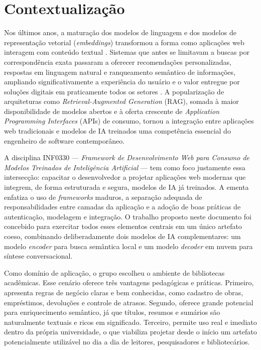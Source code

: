 \documentclass[monografia,abnt]{inf-ufg-modificado}
\begin{document}
\chapter{Contextualização}

Nos últimos anos, a maturação dos modelos de linguagem e dos modelos de representação vetorial (\textit{embeddings}) transformou a forma como aplicações web interagem com conteúdo textual \cite{vaswani,devlin}. Sistemas que antes se limitavam a buscas por correspondência exata passaram a oferecer recomendações personalizadas, respostas em linguagem natural e ranqueamento semântico de informações, ampliando significativamente a experiência do usuário e o valor entregue por soluções digitais em praticamente todos os setores \cite{breeding}. A popularização de arquiteturas como \textit{Retrieval-Augmented Generation} (RAG), somada à maior disponibilidade de modelos abertos e à oferta crescente de \textit{Application Programming Interfaces} (APIs) de consumo, tornou a integração entre aplicações web tradicionais e modelos de IA treinados uma competência essencial do engenheiro de software contemporâneo.

A disciplina INF0330 --- \textit{Framework de Desenvolvimento Web para Consumo de Modelos Treinados de Inteligência Artificial} --- tem como foco justamente essa intersecção: capacitar o desenvolvedor a projetar aplicações web modernas que integrem, de forma estruturada e segura, modelos de IA já treinados. A ementa enfatiza o uso de \textit{frameworks} maduros, a separação adequada de responsabilidades entre camadas da aplicação e a adoção de boas práticas de autenticação, modelagem e integração. O trabalho proposto neste documento foi concebido para exercitar todos esses elementos centrais em um único artefato coeso, combinando deliberadamente dois modelos de IA complementares: um modelo \textit{encoder} para busca semântica local e um modelo \textit{decoder} em nuvem para síntese conversacional.

Como domínio de aplicação, o grupo escolheu o ambiente de bibliotecas acadêmicas. Esse cenário oferece três vantagens pedagógicas e práticas. Primeiro, apresenta regras de negócio claras e bem conhecidas, como cadastro de obras, empréstimos, devoluções e controle de atrasos. Segundo, oferece grande potencial para enriquecimento semântico, já que títulos, resumos e sumários são naturalmente textuais e ricos em significado. Terceiro, permite uso real e imediato dentro da própria universidade, o que viabiliza projetar desde o início um artefato potencialmente utilizável no dia a dia de leitores, pesquisadores e bibliotecários.
\end{document}
